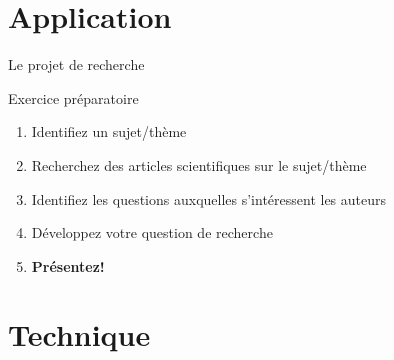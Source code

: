 \documentclass[10pt]{beamer}
\begin{document}



\section{Application}

\begin{frame}{Le projet de recherche}
    \begin{block}{Exercice préparatoire}
    \end{block}
    \begin{enumerate}
        \item Identifiez un sujet/thème
        \item Recherchez des articles scientifiques sur le sujet/thème
        \item Identifiez les questions auxquelles s'intéressent les auteurs
        \item Développez votre question de recherche
        \item \textbf{Présentez!}
    \end{enumerate}
\end{frame}

\section{Technique}

\maketitle
\end{document}
